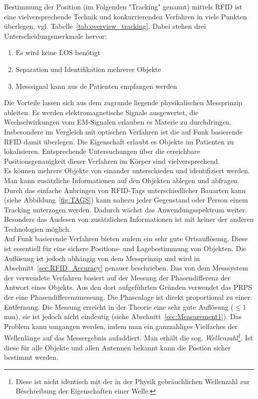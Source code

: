 Bestimmung der Position (im Folgenden "Tracking" genannt) mittels RFID ist eine vielversprechende Technik und konkurrierenden Verfahren in viele Punkten überlegen, vgl. Tabelle~\ref{tab:overview_tracking}. Dabei stehen drei Unterscheidungsmerkmale hervor:
%
\begin{enumerate}
	\item Es wird keine LOS benötigt
	\item Separation und Identifikation mehrerer Objekte
	\item Messsignal kann aus de Patienten empfangen werden
\end{enumerate}
%
Die Vorteile lassen sich aus dem zugrunde liegende physikalischen Messprinzip ableiten. Es werden elektromagnetische Signale ausgewertet, die Wechselwirkungen vom EM-Signalen erlauben es Materie zu durchdringen. Insbesondere im Vergleich mit optischen Verfahren ist die auf Funk basierende RFID damit überlegen. Die Eigenschaft erlaubt es Objekte im Patienten zu lokalisieren. Entsprechende Untersuchungen über die erreichbare  Positionsgenauigkeit dieser Verfahren im Körper sind vielversprechend.~\cite{Knipscheer1}\\

Es können mehrere Objekte von einander unterschieden und identifiziert werden. Man kann zusätzliche Informationen auf den Objekten ablegen und abfragen. Durch das einfache Anbringen von RFID-Tags unterschiedlicher Bauarten kann (siehe Abbildung~\ref{fig:TAGS}) kann nahezu jeder Gegenstand oder Person einem Tracking unterzogen werden. Dadurch wächst das Anwendungsspektrum weiter. Besonders das Auslesen von zusätzlichen Informationen ist mit keiner der anderen Technologien möglich.\\

Auf Funk basierende Verfahren bieten zudem ein sehr gute Ortsauflösung. Diese ist essentiell für eine sichere Positions- und Lagebestimmung von Objekten. Die Auflösung ist jedoch abhängig von dem Messprinzip und wird in Abschnitt~\ref{sec:RFID_Accuracy} genauer beschrieben. 
Das von dem Messsystem der \amedogmbh verwendete Verfahren basiert auf der Messung der Phasendifferenz der Antwort eines Objekts. Aus den dort aufgeführten Gründen verwendet das PRPS der \amedogmbh eine Phasendifferenzmessung. Die Phasenlage ist direkt proportional zu einer Entfernung. Die Messung erreicht in der Theorie eine sehr gute Auflösung ($\leq 1$ mm), sie ist jedoch nicht eindeutig (siehe Abschnitt~\ref{sec:Measurement1}). Das Problem kann umgangen werden, indem man ein ganzzahliges Vielfaches der Wellenlänge auf das Messergebnis aufaddiert. Man erhält die sog. \textit{Wellenzahl}\footnote{Diese ist nicht identisch mit der in der Physik gebräuchlichen Wellenzahl zur Beschreibung der Eigenschaften einer Welle.}. Ist diese für alle Objekte und allen Antennen bekannt kann die Postion sicher bestimmt werden.\\

